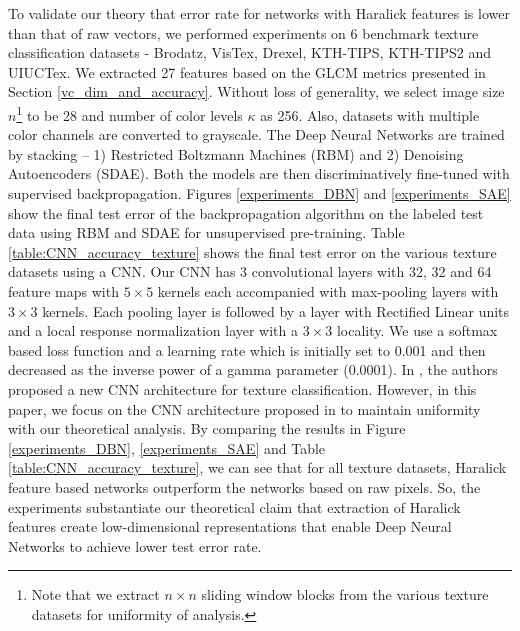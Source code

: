\documentclass[11pt,a4paper]{article}
\begin{document}
To validate our theory that error rate for networks with Haralick features is lower than that of raw vectors, we performed experiments on 6 benchmark texture classification datasets - Brodatz, VisTex, Drexel, KTH-TIPS, KTH-TIPS2 and UIUCTex. We extracted 27 features based on the GLCM metrics presented in Section \ref{vc_dim_and_accuracy}. Without loss of generality, we select image size $n$\footnote{Note that we extract $n{\times}n$ sliding window blocks from the various texture datasets for uniformity of analysis.} to be 28 and number of color levels $\kappa$ as 256. Also, datasets with multiple color channels are converted to grayscale. The Deep Neural Networks are trained by stacking -- 1) Restricted Boltzmann Machines (RBM) and 2) Denoising Autoencoders (SDAE). Both the models are then discriminatively fine-tuned with supervised backpropagation. Figures \ref{experiments_DBN} and \ref{experiments_SAE} show the final test error of the backpropagation algorithm on the labeled test data using RBM and SDAE for unsupervised pre-training. Table \ref{table:CNN_accuracy_texture} shows the final test error on the various texture datasets using a CNN. Our CNN has 3 convolutional layers with 32, 32 and 64 feature maps with $5{\times}5$ kernels each accompanied with max-pooling layers with $3{\times}3$ kernels. Each pooling layer is followed by a layer with Rectified Linear units and a local response normalization layer with a $3{\times}3$ locality. We use a softmax based loss function and a learning rate which is initially set to 0.001 and then decreased as the inverse power of a gamma parameter (0.0001). In \cite{hafemann2014analysis}, the authors proposed a new CNN architecture for texture classification. However, in this paper, we focus on the CNN architecture proposed in \cite{Lecun98gradient-basedlearning} to maintain uniformity with our theoretical analysis. By comparing the results in Figure \ref{experiments_DBN}, \ref{experiments_SAE} and Table \ref{table:CNN_accuracy_texture}, we can see that for all texture datasets, Haralick feature based networks outperform the networks based on raw pixels. So, the experiments substantiate our theoretical claim that extraction of Haralick features create low-dimensional representations that enable Deep Neural Networks to achieve lower test error rate.
\end{document}
